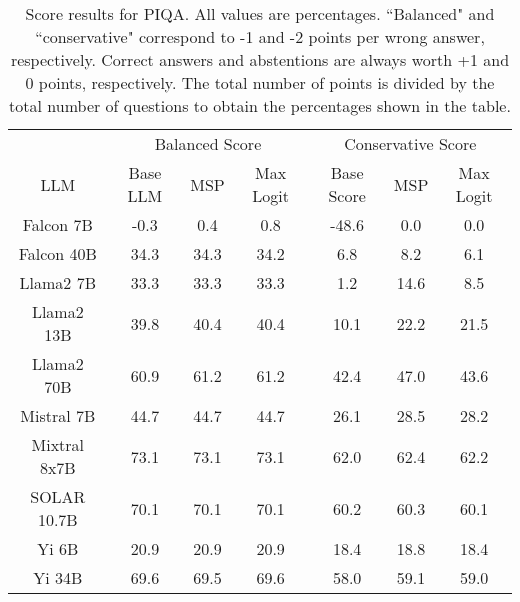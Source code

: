 \renewcommand\arraystretch{1.2}
\begin{table*}
\centering
\begin{tabular}{c|c|c|c|c|c|c}
& \multicolumn{3}{c|}{Balanced Score} & \multicolumn{3}{c}{Conservative Score} \\ 
LLM & Base LLM & MSP & Max Logit & Base Score & MSP & Max Logit\\ \hline
Falcon 7B & -0.3 & 0.4 & 0.8 & -48.6 & 0.0 & 0.0\\
Falcon 40B & 34.3 & 34.3 & 34.2 & 6.8 & 8.2 & 6.1\\
Llama2 7B & 33.3 & 33.3 & 33.3 & 1.2 & 14.6 & 8.5\\
Llama2 13B & 39.8 & 40.4 & 40.4 & 10.1 & 22.2 & 21.5\\
Llama2 70B & 60.9 & 61.2 & 61.2 & 42.4 & 47.0 & 43.6\\
Mistral 7B & 44.7 & 44.7 & 44.7 & 26.1 & 28.5 & 28.2\\
Mixtral 8x7B & 73.1 & 73.1 & 73.1 & 62.0 & 62.4 & 62.2\\
SOLAR 10.7B & 70.1 & 70.1 & 70.1 & 60.2 & 60.3 & 60.1\\
Yi 6B & 20.9 & 20.9 & 20.9 & 18.4 & 18.8 & 18.4\\
Yi 34B & 69.6 & 69.5 & 69.6 & 58.0 & 59.1 & 59.0\\
\hline
\end{tabular}
\caption{Score results for PIQA. All values are percentages. ``Balanced" and ``conservative" correspond to -1 and -2 points per wrong answer, respectively. Correct answers and abstentions are always worth +1 and 0 points, respectively. The total number of points is divided by the total number of questions to obtain the percentages shown in the table.}
\label{tab:piqa_score}
\end{table*}
